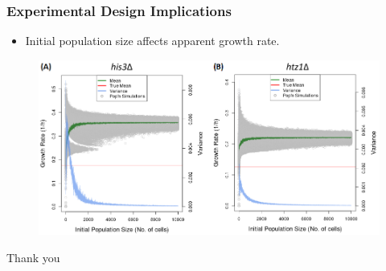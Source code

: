 \documentclass{beamer}
\begin{document}
\begin{frame}
\frametitle{Experimental Design Implications}
\begin{itemize}
\item Initial population size affects apparent growth rate.
\end{itemize}
\begin{figure}
\includegraphics[width=0.95\linewidth]{InitPopSize.png}
\end{figure}
\end{frame}


\begin{frame}
\centering
\Huge{Thank you}
\end{frame}
\end{document}
